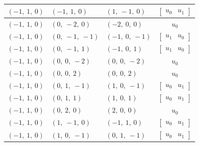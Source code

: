 \documentclass[11pt]{article}
\theoremstyle{definition}
\begin{document}
\begin{longtable}{|l|l|l|c|}
    \hline
    $\left( -1, \  1, \  0\right)$ & $\left( -1, \  1, \  0\right)$ & $\left( 1, \  -1, \  0\right)$ & $\left[\begin{matrix}u_{0} & u_{1}\end{matrix}\right]$ \\
    \hline
    $\left( -1, \  1, \  0\right)$ & $\left( 0, \  -2, \  0\right)$ & $\left( -2, \  0, \  0\right)$ & $u_{0}$ \\
    \hline
    $\left( -1, \  1, \  0\right)$ & $\left( 0, \  -1, \  -1\right)$ & $\left( -1, \  0, \  -1\right)$ & $\left[\begin{matrix}u_{1} & u_{0}\end{matrix}\right]$ \\
    \hline
    $\left( -1, \  1, \  0\right)$ & $\left( 0, \  -1, \  1\right)$ & $\left( -1, \  0, \  1\right)$ & $\left[\begin{matrix}u_{1} & u_{0}\end{matrix}\right]$ \\
    \hline
    $\left( -1, \  1, \  0\right)$ & $\left( 0, \  0, \  -2\right)$ & $\left( 0, \  0, \  -2\right)$ & $u_{0}$ \\
    \hline
    $\left( -1, \  1, \  0\right)$ & $\left( 0, \  0, \  2\right)$ & $\left( 0, \  0, \  2\right)$ & $u_{0}$ \\
    \hline
    $\left( -1, \  1, \  0\right)$ & $\left( 0, \  1, \  -1\right)$ & $\left( 1, \  0, \  -1\right)$ & $\left[\begin{matrix}u_{0} & u_{1}\end{matrix}\right]$ \\
    \hline
    $\left( -1, \  1, \  0\right)$ & $\left( 0, \  1, \  1\right)$ & $\left( 1, \  0, \  1\right)$ & $\left[\begin{matrix}u_{0} & u_{1}\end{matrix}\right]$ \\
    \hline
    $\left( -1, \  1, \  0\right)$ & $\left( 0, \  2, \  0\right)$ & $\left( 2, \  0, \  0\right)$ & $u_{0}$ \\
    \hline
    $\left( -1, \  1, \  0\right)$ & $\left( 1, \  -1, \  0\right)$ & $\left( -1, \  1, \  0\right)$ & $\left[\begin{matrix}u_{0} & u_{1}\end{matrix}\right]$ \\
    \hline
    $\left( -1, \  1, \  0\right)$ & $\left( 1, \  0, \  -1\right)$ & $\left( 0, \  1, \  -1\right)$ & $\left[\begin{matrix}u_{0} & u_{1}\end{matrix}\right]$ \\

\end{longtable}
\end{document}
